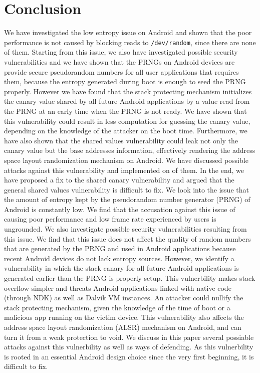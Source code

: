 \section{Conclusion}

We have investigated the low entropy issue on Android and shown that the poor performance is not caused by blocking reads to \verb|/dev/random|, since there are none of them. Starting from this issue, we also have investigated possible security vulnerabilities and we have shown that the PRNGs on Android devices are provide secure pseudorandom numbers for all user applications that requires them, because the entropy generated during boot is enough to seed the PRNG properly. However we have found that the stack protecting mechanism initializes the canary value shared by all future Android applications by a value read from the PRNG at an early time when the PRNG is not ready. We have shown that this vulnerability could result in less computation for guessing the canary value, depending on the knowledge of the attacker on the boot time. Furthermore, we have also shown that the shared values vulnerability could leak not only the canary value but the base addresses information, effectively rendering the address space layout randomization mechanism on Android. We have discussed possible attacks against this vulnerability and implemented on of them. In the end, we have proposed a fix to the shared canary vulnerability and argued that the general shared values vulnerability is difficult to fix.
We look into the issue that the amount of entropy kept by the pseudorandom number generator (PRNG) of Android is constantly low. We find that the accusation against this issue of causing poor performance and low frame rate experienced by users is ungrounded. We also investigate possible security vulnerabilities resulting from this issue. We find that this issue does not affect the quality of random numbers that are generated by the PRNG and used in Android applications because recent Android devices do not lack entropy sources. However, we identify a vulnerability in which the stack canary for all future Android applications is generated earlier than the PRNG is properly setup. This vulnerbility makes stack overflow simpler and threats Android applications linked with native code (through NDK) as well as Dalvik VM instances. An attacker could nullify the stack protecting mechanism, given the knowledge of the time of boot or a malicious app running on the victim device. This vulnerability also affects the address space layout randomization (ALSR) mechanism on Android, and can turn it from a weak protection to void. We discuss in this paper several possiable attacks against this vulnerbility as well as ways of defending. As this vulnerbility is rooted in an essential Android design choice since the very first beginning, it is difficult to fix.

